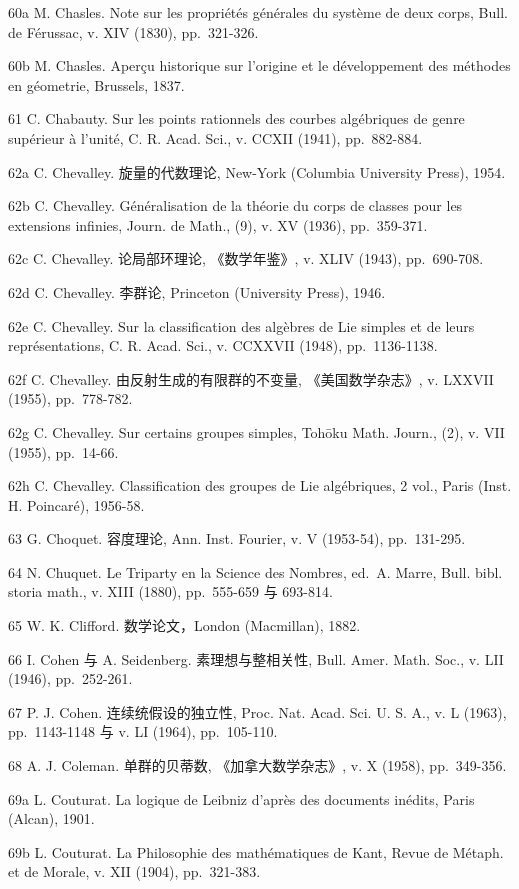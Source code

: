 60a M. Chasles. Note sur les propriétés générales du système de deux corps, Bull. de Férussac, v. XIV (1830), pp.~321-326.

60b M. Chasles. Aperçu historique sur l'origine et le développement des méthodes en géometrie, Brussels, 1837.

61 C. Chabauty. Sur les points rationnels des courbes algébriques de genre supérieur à l'unité, C. R. Acad. Sci., v. CCXII (1941), pp.~882-884.

62a C. Chevalley. 旋量的代数理论, New-York (Columbia University Press), 1954.

62b C. Chevalley. Généralisation de la théorie du corps de classes pour les extensions infinies, Journ. de Math., (9), v. XV (1936), pp.~359-371.

62c C. Chevalley. 论局部环理论, 《数学年鉴》, v. XLIV (1943), pp.~690-708.

62d C. Chevalley. 李群论, Princeton (University Press), 1946.

62e C. Chevalley. Sur la classification des algèbres de Lie simples et de leurs représentations, C. R. Acad. Sci., v. CCXXVII (1948), pp.~1136-1138.

62f C. Chevalley. 由反射生成的有限群的不变量, 《美国数学杂志》, v. LXXVII (1955), pp.~778-782.

62g C. Chevalley. Sur certains groupes simples, Tohōku Math. Journ., (2), v. VII (1955), pp.~14-66.

62h C. Chevalley. Classification des groupes de Lie algébriques, 2 vol., Paris (Inst. H. Poincaré), 1956-58.

63 G. Choquet. 容度理论, Ann. Inst. Fourier, v. V (1953-54), pp.~131-295.

64 N. Chuquet. Le Triparty en la Science des Nombres, ed.~A. Marre, Bull. bibl. storia math., v. XIII (1880), pp.~555-659 与 693-814.

65 W. K. Clifford. 数学论文，London (Macmillan), 1882.

66 I. Cohen 与 A. Seidenberg. 素理想与整相关性, Bull. Amer. Math. Soc., v. LII (1946), pp.~252-261.

67 P. J. Cohen. 连续统假设的独立性, Proc. Nat. Acad. Sci. U. S. A., v. L (1963), pp.~1143-1148 与 v. LI (1964), pp.~105-110.

68 A. J. Coleman. 单群的贝蒂数, 《加拿大数学杂志》, v. X (1958), pp.~349-356.

69a L. Couturat. La logique de Leibniz d'après des documents inédits, Paris (Alcan), 1901.

69b L. Couturat. La Philosophie des mathématiques de Kant, Revue de Métaph. et de Morale, v. XII (1904), pp.~321-383.


